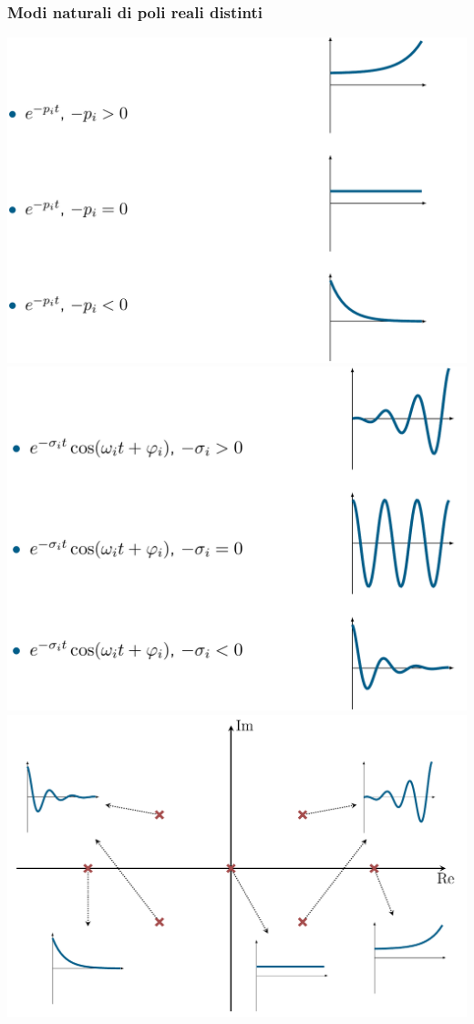 \documentclass{article}
\numberwithin{equation}{subsection}
\begin{document}
\subsubsection{Modi naturali di poli reali distinti}
\begin{center}
    \includegraphics[scale=0.2]{Images/Modi_naturali_poli_distinti_1.png}
    \includegraphics[scale=0.2]{Images/Modi_naturali_poli_distinti_2.png}
    \includegraphics[scale=0.2]{Images/Modi_naturali_poli_distinti_3.png}
\end{center}
\end{document}
